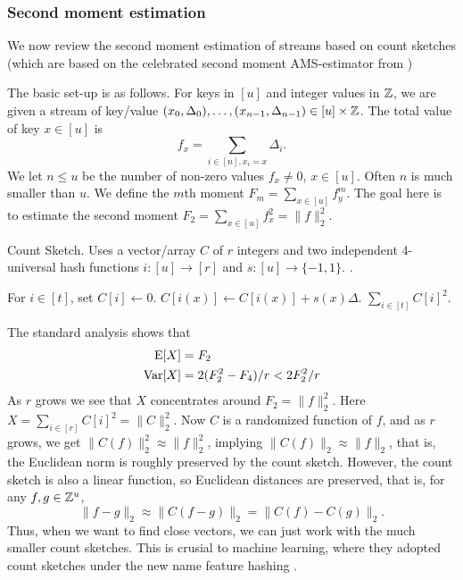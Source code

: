 \subsubsection{Second moment estimation}\label{sec:count-sketch}
We now review the second moment estimation of streams based on count
sketches \cite{charikar04count-sketch} (which are based on the
celebrated second moment AMS-estimator from \cite{alon96frequency})

The basic set-up is as follows.  For keys in $[u]$ and integer values in $\mathbb Z$, we are given a stream of key/value $(x_0,\Delta_0),\ldots, (x_{n-1},\Delta_{n-1})\in [u]\times\mathbb Z$. The
total value of key $x\in[u]$ is
\[f_x=\sum_{i\in[n],x_i=x} \Delta_i.\]
We let $n\leq u$ be  the number of non-zero values
$f_x\neq 0$, $x\in [u]$. Often $n$ is much smaller than $u$.
We define the $m$th moment $F_m = \sum_{x\in [u]}f_y^m$. The goal here is to
estimate the second moment $F_2 = \sum_{x\in [u]}f_x^2=\|f\|^2_2$. 

\begin{algorithm}[H]
   \caption{\label{alg:count-sketch} Count Sketch. Uses a
      vector/array $C$ of $r$ integers and two independent
      4-universal hash functions $i:[u]\to[r]$ and $s:[u]\to\{-1,1\}$.
   .}
   \begin{algorithmic}
         \State For $i\in[t]$, set $C[i]\gets 0$.
      \EndProcedure
         \State $C[i(x)]\gets C[i(x)]+s(x) \Delta$. 
      \EndProcedure
         \State \Return $\sum_{i\in[t]} C[i]^2$.
      \EndProcedure
   \end{algorithmic}
\end{algorithm}
The standard analysis \cite{charikar04count-sketch} shows that 
\begin{align}
   \operatorname*{E}[X]&= F_2 \label{eq:E-F2}\\
   \operatorname*{Var}[X]&=2(F_2^2 - F_4)/r<2F_2^2/r \label{eq:V-F2}
\end{align}
As $r$ grows we see that $X$ concentrates around $F_2=\|f\|^2_2$. Here
$X=\sum_{i\in[r]} C[i]^2=\|C\|^2_2$. Now $C$ is a randomized 
function of $f$, and as $r$ grows, we get $\|C(f)\|^2_2\approx\|f\|^2_2$,
implying $\|C(f)\|_2\approx\|f\|_2$, that is, the Euclidean norm is
roughly preserved by the count sketch. However, the count sketch
is also a linear function, so Euclidean distances are preserved, that
is, for any $f,g\in \mathbb Z^u$,
\[\|f-g\|_2\approx \|C(f-g)\|_2=\|C(f)-C(g)\|_2.\]
Thus, when we want to find close vectors, we can just work with the
much smaller count sketches. This is crusial to machine learning,
where they adopted count sketches under the new name feature hashing
\cite{WDLSA09}.

